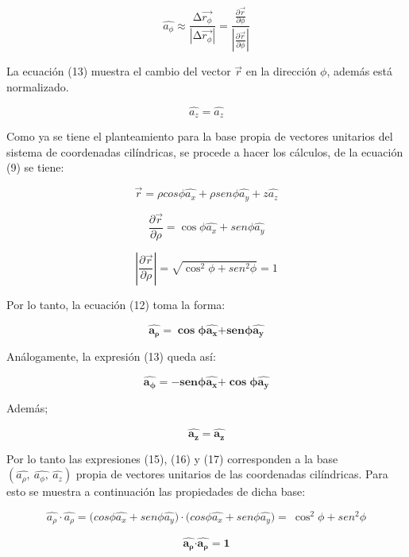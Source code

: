 \documentclass[]{article}
\begin{document}
\[\widehat{a_{\phi}} \approx \frac{\mathrm{\Delta}\overrightarrow{r_{\phi}}}{\left| \mathrm{\Delta}\overrightarrow{r_{\phi}} \right|} = \frac{\frac{\partial\overrightarrow{r}}{\partial\phi}}{\left| \frac{\partial\overrightarrow{r}}{\partial\phi} \right|}\]

La ecuación (13) muestra el cambio del vector \(\overrightarrow{r}\) en
la dirección \(\phi\), además está normalizado.

\[\widehat{a_{z}} = \widehat{a_{z}}\]

Como ya se tiene el planteamiento para la base propia de vectores
unitarios del sistema de coordenadas cilíndricas, se procede a hacer los
cálculos, de la ecuación (9) se tiene:

\[\overrightarrow{r} = \rho cos\phi\widehat{a_{x}} + \rho{sen}\phi\widehat{a_{y}} + z\widehat{a_{z}}\]

\[\frac{\partial\overrightarrow{r}}{\partial\rho} = \cos\phi\widehat{a_{x}} + {sen}\phi\widehat{a_{y}}\]

\[\left| \frac{\partial\overrightarrow{r}}{\partial\rho} \right| = \sqrt{\cos^{2}\phi + {sen}^{2}\phi} = 1\]

Por lo tanto, la ecuación (12) toma la forma:

\[\widehat{\mathbf{a}_{\mathbf{\rho}}}\mathbf{=}\mathbf{\cos}\mathbf{\phi}\widehat{\mathbf{a}_{\mathbf{x}}}\mathbf{+}\mathbf{sen}\mathbf{\phi}\widehat{\mathbf{a}_{\mathbf{y}}}\]

Análogamente, la expresión (13) queda así:

\[\widehat{\mathbf{a}_{\mathbf{\phi}}}\mathbf{= -}\mathbf{sen}\mathbf{\phi}\widehat{\mathbf{a}_{\mathbf{x}}}\mathbf{+}\mathbf{\cos}\mathbf{\phi}\widehat{\mathbf{a}_{\mathbf{y}}}\]

Además;

\[\widehat{\mathbf{a}_{\mathbf{z}}}\mathbf{=}\widehat{\mathbf{a}_{\mathbf{z}}}\]

Por lo tanto las expresiones (15), (16) y (17) corresponden a la base
\(\left( \widehat{a_{\rho},}\ \widehat{a_{\phi},}\ \widehat{a_{z}} \right)\)
propia de vectores unitarios de las coordenadas cilíndricas. Para esto
se muestra a continuación las propiedades de dicha base:

\[\widehat{a_{\rho}} \cdot \widehat{a_{\rho}} = {(cos}\phi\widehat{a_{x}} + {sen}\phi\widehat{a_{y}}) \cdot {(cos}\phi\widehat{a_{x}} + {sen}\phi\widehat{a_{y}}) = \ \cos^{2}\phi + {sen}^{2}\phi\]

\[\widehat{\mathbf{a}_{\mathbf{\rho}}}\mathbf{\cdot}\widehat{\mathbf{a}_{\mathbf{\rho}}}\mathbf{= 1}\]
\end{document}
